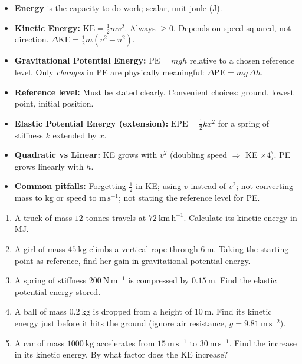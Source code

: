 \documentclass[11pt]{article}
\begin{document}
\begin{aretenir}
\begin{itemize}
\item \textbf{Energy} is the capacity to do work; scalar, unit joule (J).
\item \textbf{Kinetic Energy:} $\mathrm{KE} = \frac{1}{2}mv^2$. Always $\ge 0$. Depends on speed squared, not direction. $\Delta\mathrm{KE} = \frac{1}{2}m(v^2 - u^2)$.
\item \textbf{Gravitational Potential Energy:} $\mathrm{PE} = mgh$ relative to a chosen reference level. Only \emph{changes} in PE are physically meaningful: $\Delta\mathrm{PE} = mg\,\Delta h$.
\item \textbf{Reference level:} Must be stated clearly. Convenient choices: ground, lowest point, initial position.
\item \textbf{Elastic Potential Energy (extension):} $\mathrm{EPE} = \frac{1}{2}kx^2$ for a spring of stiffness $k$ extended by $x$.
\item \textbf{Quadratic vs Linear:} KE grows with $v^2$ (doubling speed $\Rightarrow$ KE $\times 4$). PE grows linearly with $h$.
\item \textbf{Common pitfalls:} Forgetting $\frac{1}{2}$ in KE; using $v$ instead of $v^2$; not converting mass to kg or speed to $\mathrm{m\,s^{-1}}$; not stating the reference level for PE.
\end{itemize}
\end{aretenir}

\begin{exercice}
\begin{enumerate}
\item A truck of mass $12$ tonnes travels at $72\ \mathrm{km\,h^{-1}}$. Calculate its kinetic energy in MJ.
\item A girl of mass $45\ \mathrm{kg}$ climbs a vertical rope through $6\ \mathrm{m}$. Taking the starting point as reference, find her gain in gravitational potential energy.
\item A spring of stiffness $200\ \mathrm{N\,m^{-1}}$ is compressed by $0.15\ \mathrm{m}$. Find the elastic potential energy stored.
\item A ball of mass $0.2\ \mathrm{kg}$ is dropped from a height of $10\ \mathrm{m}$. Find its kinetic energy just before it hits the ground (ignore air resistance, $g = 9.81\ \mathrm{m\,s^{-2}}$).
\item A car of mass $1000\ \mathrm{kg}$ accelerates from $15\ \mathrm{m\,s^{-1}}$ to $30\ \mathrm{m\,s^{-1}}$. Find the increase in its kinetic energy. By what factor does the KE increase?
\end{enumerate}
\end{exercice}
\end{document}
